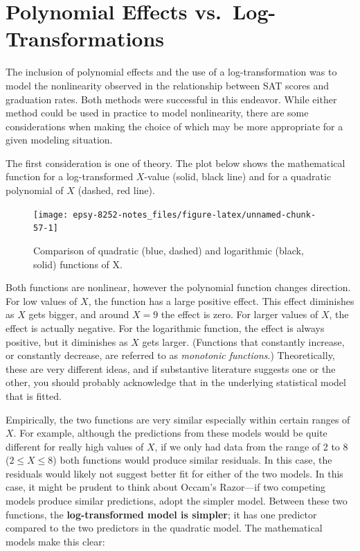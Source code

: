 \documentclass[]{book}
\begin{document}
\hypertarget{polynomial-effects-vs.-log-transformations}{%
\section{Polynomial Effects vs.~Log-Transformations}\label{polynomial-effects-vs.-log-transformations}}

The inclusion of polynomial effects and the use of a log-transformation was to model the nonlinearity observed in the relationship between SAT scores and graduation rates. Both methods were successful in this endeavor. While either method could be used in practice to model nonlinearity, there are some considerations when making the choice of which may be more appropriate for a given modeling situation.

The first consideration is one of theory. The plot below shows the mathematical function for a log-transformed \(X\)-value (solid, black line) and for a quadratic polynomial of \(X\) (dashed, red line).

\begin{figure}

{\centering \texttt{[image: epsy-8252-notes\_files/figure-latex/unnamed-chunk-57-1]} 

}

\caption{Comparison of quadratic (blue, dashed) and logarithmic (black, solid) functions of X.}\label{fig:unnamed-chunk-57}
\end{figure}

Both functions are nonlinear, however the polynomial function changes direction. For low values of \(X\), the function has a large positive effect. This effect diminishes as \(X\) gets bigger, and around \(X=9\) the effect is zero. For larger values of \(X\), the effect is actually negative. For the logarithmic function, the effect is always positive, but it diminishes as \(X\) gets larger. (Functions that constantly increase, or constantly decrease, are referred to as \emph{monotonic functions}.) Theoretically, these are very different ideas, and if substantive literature suggests one or the other, you should probably acknowledge that in the underlying statistical model that is fitted.

Empirically, the two functions are very similar especially within certain ranges of \(X\). For example, although the predictions from these models would be quite different for really high values of \(X\), if we only had data from the range of 2 to 8 (\(2\leq X \leq 8\)) both functions would produce similar residuals. In this case, the residuals would likely not suggest better fit for either of the two models. In this case, it might be prudent to think about Occam's Razor---if two competing models produce similar predictions, adopt the simpler model. Between these two functions, the \textbf{log-transformed model is simpler}; it has one predictor compared to the two predictors in the quadratic model. The mathematical models make this clear:
\end{document}
